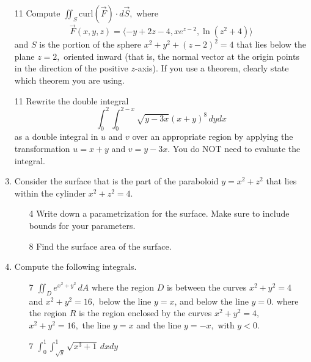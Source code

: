 \documentclass[addpoints,12pt]{exam}
\begin{document}
\begin{enumerate}
\begin{itemize}
\vfill
\end{itemize}
\newpage
\item[11] Compute $\displaystyle\iint_{S} \text{curl} (\vec{F}) \cdot d{\vec{S}},$ where
$$\vec{F}(x,y,z) = \langle -y+2z -4, xe^{z-2}, \ln(z^2+4) \rangle$$
and $S$ is the portion of the sphere $x^2+y^2+(z-2)^2 = 4$ that lies below the plane $z=2,$
oriented inward (that is, the normal vector at the origin points in the direction of the positive
$z$-axis). If you use a theorem, clearly state which theorem you are using.
\newpage
\newpage
\newpage
\item[11] Rewrite the double integral $$\displaystyle\int_0^2\int_0^{2-x}\sqrt{y-3x}(x+y)^8\,
dydx$$ as a double integral in $u$ and $v$ over an appropriate region by applying the
transformation $u = x+y$ and $v = y-3x$. You do NOT need to evaluate the integral.
\newpage
\item Consider the surface that is the part of the paraboloid $y=x^2+z^2$ that lies within the
cylinder $x^2+z^2=4.$
\begin{itemize}
\item[4] Write down a parametrization for the surface. Make sure to include bounds for your
parameters.
\vfill
\item[8] Find the surface area of the surface.
\vfill
\vfill
\vfill
\vfill
\vfill
\end{itemize}
\newpage
\item Compute the following integrals.
\medskip
\begin{itemize}
\item[7] $\displaystyle\iint_{D} e^{x^2+y^2}\, dA$ where the region $D$ is between the curves
$x^2+y^2=4$ and $x^2+y^2 = 16,$ below the line $y=x$, and below the line $y=0$.
where the region $R$ is the region enclosed by the curves $x^2+y^2=4,$ $x^2+y^2 = 16,$ the
line $y=x$ and the line $y=-x,$ with $y<0.$
\vfill
\item[7] $\displaystyle\int_0^1 \int_{\sqrt{y}}^1 \sqrt{x^3+1} \, dx dy$
\vfill
\newpage

\end{itemize}
\end{enumerate}
\end{document}
